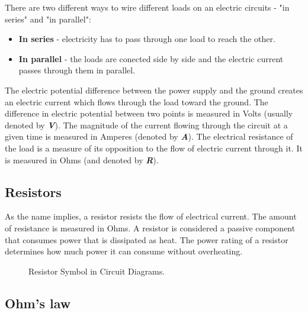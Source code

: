 There are two different ways to wire different loads on an electric circuits - "in series" and "in parallel":
\begin{itemize}
    \item \textbf{In series} - electricity has to pass through one load to reach the other.
    \item \textbf{In parallel} - the loads are conected side by side and the electric current passes through them in parallel.
\end{itemize}

The electric potential difference between the power supply and the ground creates an
electric current which flows through the load toward the ground. The difference
in electric potential between two points is measured in Volts (usually denoted
by \textbf{\textit{V}}). The magnitude of the current flowing through the circuit at a
given time is measured in Amperes (denoted by \textbf{\textit{A}}). The
electrical resistance of the load is a measure of its opposition to the flow of
electric current through it. It is measured in Ohms (and denoted by
\textbf{\textit{R}}).

\subsection{Resistors}

As the name implies, a resistor resists the flow of electrical current. The
amount of resistance is measured in Ohms. A resistor is considered a passive
component that consumes power that is dissipated as heat. The power rating of a
resistor determines how much power it can consume without overheating.

\begin{figure}[!ht]
    \centering
    
    \caption{Resistor Symbol in Circuit Diagrams.} \label{fig:resistor}
\end{figure}

\subsection{Ohm's law}

